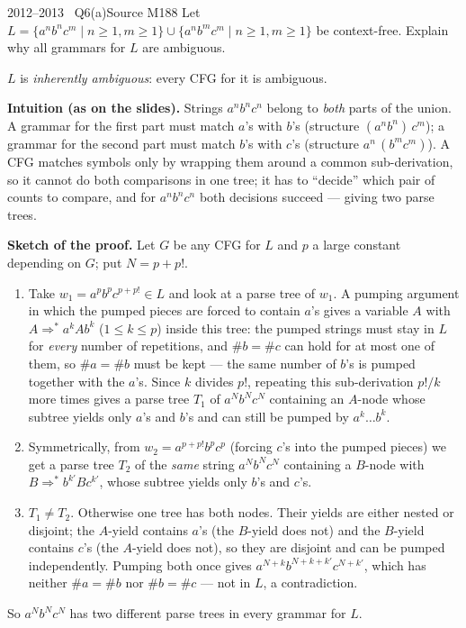 \documentclass[11pt,a4paper]{article}
\begin{document}
\begin{question}{2012--2013 \textbullet\ Q6(a)}{Source M18}{8}
Let $L=\{a^nb^nc^m\mid n\ge1,m\ge1\}\cup\{a^nb^mc^m\mid n\ge1,m\ge1\}$ be context-free. Explain why all grammars for $L$ are ambiguous.
\end{question}
\begin{solution}
$L$ is \emph{inherently ambiguous}: every CFG for it is ambiguous.

\textbf{Intuition (as on the slides).} Strings $a^nb^nc^n$ belong to \emph{both} parts of the union. A grammar for the first part must match $a$'s with $b$'s (structure $(a^nb^n)\,c^m$); a grammar for the second part must match $b$'s with $c$'s (structure $a^n\,(b^mc^m)$). A CFG matches symbols only by wrapping them around a common sub-derivation, so it cannot do both comparisons in one tree; it has to ``decide'' which pair of counts to compare, and for $a^nb^nc^n$ both decisions succeed --- giving two parse trees.

\textbf{Sketch of the proof.} Let $G$ be any CFG for $L$ and $p$ a large constant depending on $G$; put $N=p+p!$.
\begin{enumerate}
\item Take $w_1=a^pb^pc^{p+p!}\in L$ and look at a parse tree of $w_1$. A pumping argument in which the pumped pieces are forced to contain $a$'s gives a variable $A$ with $A\Rightarrow^*a^kAb^k$ ($1\le k\le p$) inside this tree: the pumped strings must stay in $L$ for \emph{every} number of repetitions, and $\#b=\#c$ can hold for at most one of them, so $\#a=\#b$ must be kept --- the same number of $b$'s is pumped together with the $a$'s. Since $k$ divides $p!$, repeating this sub-derivation $p!/k$ more times gives a parse tree $T_1$ of $a^Nb^Nc^N$ containing an $A$-node whose subtree yields only $a$'s and $b$'s and can still be pumped by $a^k\ldots b^k$.
\item Symmetrically, from $w_2=a^{p+p!}b^pc^p$ (forcing $c$'s into the pumped pieces) we get a parse tree $T_2$ of the \emph{same} string $a^Nb^Nc^N$ containing a $B$-node with $B\Rightarrow^*b^{k'}Bc^{k'}$, whose subtree yields only $b$'s and $c$'s.
\item $T_1\neq T_2$. Otherwise one tree has both nodes. Their yields are either nested or disjoint; the $A$-yield contains $a$'s (the $B$-yield does not) and the $B$-yield contains $c$'s (the $A$-yield does not), so they are disjoint and can be pumped independently. Pumping both once gives $a^{N+k}b^{N+k+k'}c^{N+k'}$, which has neither $\#a=\#b$ nor $\#b=\#c$ --- not in $L$, a contradiction.
\end{enumerate}
So $a^Nb^Nc^N$ has two different parse trees in every grammar for $L$.


\end{solution}
\end{document}
